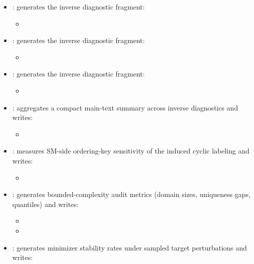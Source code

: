 \begin{sloppypar}
\begin{itemize}
\begin{itemize}
\item {}
\end{itemize}
\item {}: generates the inverse diagnostic fragment:
\begin{itemize}
\item {}
\end{itemize}
\item {}: generates the inverse diagnostic fragment:
\begin{itemize}
\item {}
\end{itemize}
\item {}: generates the inverse diagnostic fragment:
\begin{itemize}
\item {}
\end{itemize}
\item {}: aggregates a compact main-text summary across inverse diagnostics and writes:
\begin{itemize}
\item {}
\end{itemize}
\item {}: measures SM-side ordering-key sensitivity of the induced cyclic labeling and writes:
\begin{itemize}
\item {}
\end{itemize}
\item {}: generates bounded-complexity audit metrics (domain sizes, uniqueness gaps, quantiles) and writes:
\begin{itemize}
\item {}
\item {}
\end{itemize}
\item {}: generates minimizer stability rates under sampled target perturbations and writes:

\end{itemize}
\end{sloppypar}
